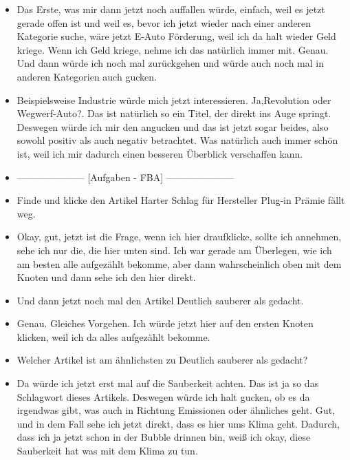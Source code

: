 {\begin{itemize}[]
        \item {} Das Erste, was mir dann jetzt noch auffallen würde, einfach, weil es jetzt gerade offen ist und weil es, bevor ich jetzt wieder nach einer anderen Kategorie suche, wäre jetzt \flqq E-Auto Förderung\frqq{}, weil ich da halt wieder Geld kriege.
              Wenn ich Geld kriege, nehme ich das natürlich immer mit.
              Genau.
              Und dann würde ich noch mal zurückgehen und würde auch noch mal in anderen Kategorien auch gucken.
        \item {} Beispielsweise Industrie würde mich jetzt interessieren.
              Ja,\flqq Revolution oder Wegwerf-Auto?\frqq{}.
              Das ist natürlich so ein Titel, der direkt ins Auge springt.
              Deswegen würde ich mir den angucken und das ist jetzt sogar beides, also sowohl positiv als auch negativ betrachtet.
              Was natürlich auch immer schön ist, weil ich mir dadurch einen besseren Überblick verschaffen kann.
        \item {---------------------} [Aufgaben - FBA] {---------------------}
        \item {} Finde und klicke den Artikel \flqq Harter Schlag für Hersteller Plug-in Prämie fällt weg\frqq{}.
        \item {} Okay, gut, jetzt ist die Frage, wenn ich hier draufklicke, sollte ich annehmen, sehe ich nur die, die hier unten sind.
              Ich war gerade am Überlegen, wie ich am besten alle aufgezählt bekomme, aber dann wahrscheinlich oben mit dem Knoten und dann sehe ich den hier direkt.
        \item {} Und dann jetzt noch mal den Artikel \flqq Deutlich sauberer als gedacht\frqq{}.
        \item {} Genau. Gleiches Vorgehen. Ich würde jetzt hier auf den ersten Knoten klicken, weil ich da alles aufgezählt bekomme.
        \item {} Welcher Artikel ist am ähnlichsten zu \flqq Deutlich sauberer als gedacht\frqq{}?
        \item {} Da würde ich jetzt erst mal auf die Sauberkeit achten.
              Das ist ja so das Schlagwort dieses Artikels.
              Deswegen würde ich halt gucken, ob es da irgendwas gibt, was auch in Richtung Emissionen oder ähnliches geht.
              Gut, und in dem Fall sehe ich jetzt direkt, dass es hier ums Klima geht.
              Dadurch, dass ich ja jetzt schon in der Bubble drinnen bin, weiß ich okay, diese Sauberkeit hat was mit dem Klima zu tun.

\end{itemize}}
